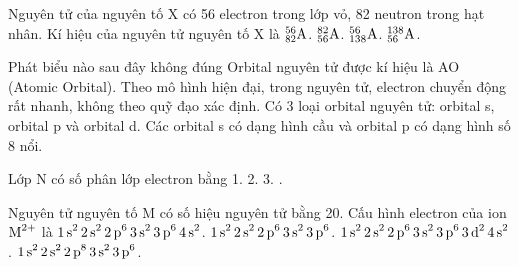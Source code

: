 \documentclass[11pt,a4paper]{article}
\begin{document}
\begin{ex}
Nguyên tử của nguyên tố X có 56 electron trong lớp vỏ, 82 neutron trong hạt nhân. Kí hiệu của nguyên tử nguyên tố X là
\choice
{$^{56}_{82}\ce{A}$.}
{$^{82}_{56}\ce{A}$.}
{$^{56}_{138}\ce{A}$.}
{\True $^{138}_{56}\ce{A}$.}

\end{ex}
\begin{ex}
Phát biểu nào sau đây không đúng
\choice
{Orbital nguyên tử được kí hiệu là AO (Atomic Orbital).}
{Theo mô hình hiện đại, trong nguyên tử, electron chuyển động rất nhanh, không theo quỹ đạo xác định.}
{\True Có 3 loại orbital nguyên tử: orbital s, orbital p và orbital d.}
{Các orbital s có dạng hình cầu và orbital p có dạng hình số 8 nổi.}

\end{ex}
\begin{ex}
Lớp N có số phân lớp electron bằng
\choice
{1.}
{2.}
{3.}
{.}

\end{ex}
\begin{ex}
Nguyên tử nguyên tố M có số hiệu nguyên tử bằng 20. Cấu hình electron của ion $\ce{M^{2+}}$ là
\choice
{$\ce{1s^2 2s^2 2p^6 3s^2 3p^6 4s^2}$.}
{\True $\ce{1s^2 2s^2 2p^6 3s^2 3p^6}$.}
{$\ce{1s^2 2s^2 2p^6 3s^2 3p^6 3d^2 4s^2}$.}
{$\ce{1s^2 2s^2 2p^8 3s^2 3p^6}$.}

\end{ex}
\end{document}

